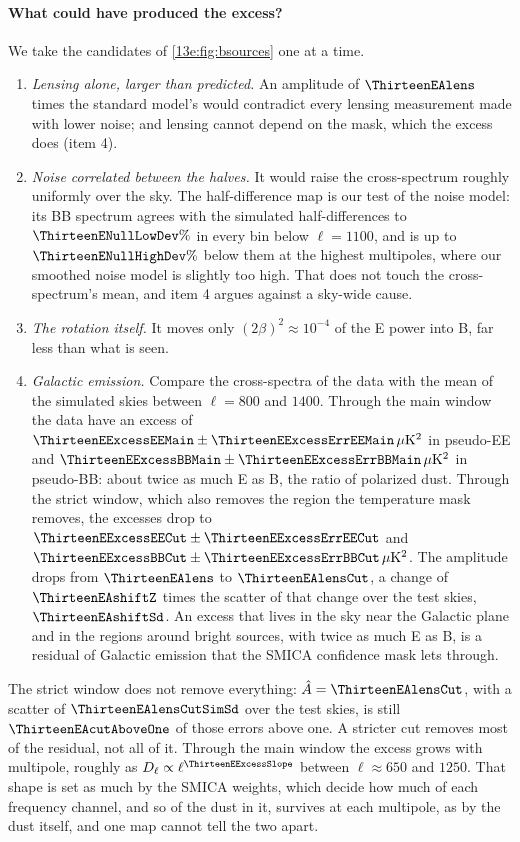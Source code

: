 \paragraph{What could have produced the excess?} We take the candidates of \cref{13e:fig:bsources} one at a time.
\begin{enumerate}[itemsep=2pt,leftmargin=1.5em]
  \item \emph{Lensing alone, larger than predicted.} An amplitude of $\ThirteenEAlens$ times the standard model's would
        contradict every lensing measurement made with lower noise; and lensing cannot depend on the mask,
        which the excess does (item 4).
  \item \emph{Noise correlated between the halves.} It would raise the cross-spectrum roughly uniformly over the
        sky. The half-difference map is our test of the noise model: its BB spectrum agrees with the simulated
        half-differences to $\ThirteenENullLowDev\%$ in every bin below $\ell=1100$, and is up to
        $\ThirteenENullHighDev\%$ below them at the highest multipoles, where our smoothed noise model is
        slightly too high. That does not touch the cross-spectrum's mean, and item 4 argues against a
        sky-wide cause.
  \item \emph{The rotation itself.} It moves only $(2\beta)^2\approx10^{-4}$ of the E power into B, far less than
        what is seen.
  \item \emph{Galactic emission.} Compare the cross-spectra of the data with the mean of the simulated skies
        between $\ell=800$ and $1400$. Through the main window the data have an excess of
        $\ThirteenEExcessEEMain\pm\ThirteenEExcessErrEEMain\,\mu{\rm K}^2$ in pseudo-EE and
        $\ThirteenEExcessBBMain\pm\ThirteenEExcessErrBBMain\,\mu{\rm K}^2$ in pseudo-BB: about twice as much E as B,
        the ratio of polarized dust. Through the strict window, which also removes the region the temperature
        mask removes, the excesses drop to $\ThirteenEExcessEECut\pm\ThirteenEExcessErrEECut$ and
        $\ThirteenEExcessBBCut\pm\ThirteenEExcessErrBBCut\,\mu{\rm K}^2$. The amplitude drops from
        $\ThirteenEAlens$ to $\ThirteenEAlensCut$, a change of $\ThirteenEAshiftZ$ times the scatter of that
        change over the test skies, $\ThirteenEAshiftSd$. An excess that lives in the sky near the Galactic
        plane and in the regions around bright sources, with twice as much E as B, is a residual of Galactic
        emission that the SMICA confidence mask lets through.
\end{enumerate}
The strict window does not remove everything: $\hat A=\ThirteenEAlensCut$, with a scatter of
$\ThirteenEAlensCutSimSd$ over the test skies, is still $\ThirteenEAcutAboveOne$ of those errors above one. A
stricter cut removes most of the residual, not all of it. Through the main window the excess grows with
multipole, roughly as $D_\ell\propto\ell^{\ThirteenEExcessSlope}$ between $\ell\approx650$ and $1250$. That
shape is set as much by the SMICA weights, which decide how much of each frequency channel, and so of the
dust in it, survives at each multipole, as by the dust itself, and one map cannot tell the two apart.

